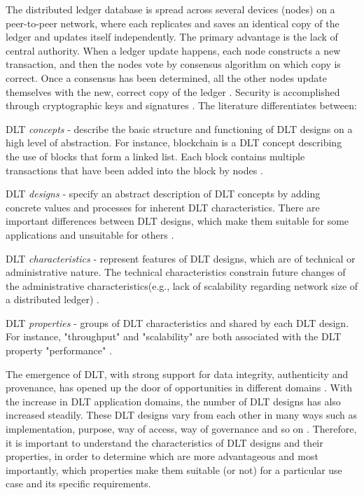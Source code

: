 The distributed ledger database is spread across several devices (nodes) on a peer-to-peer network, where each replicates and saves an identical copy of the ledger and updates itself independently. The primary advantage is the lack of central authority. When a ledger update happens, each node constructs a new transaction, and then the nodes vote by consensus algorithm on which copy is correct. Once a consensus has been determined, all the other nodes update themselves with the new, correct copy of the ledger \cite{dlt_2}. Security is accomplished through cryptographic keys and signatures \cite{dlt_1}. The literature \cite{dlt_4} differentiates between: \newline

DLT \textit{concepts} - describe the basic structure and functioning of DLT designs on a high level of abstraction. For instance, blockchain is a DLT concept describing the use of blocks that form a linked list. Each block contains multiple transactions that have been added into the block by nodes \cite{dlt_4}. \newline

DLT \textit{designs} - specify an abstract description of DLT concepts by adding concrete values and processes for inherent DLT characteristics. There are important differences between DLT designs, which make them suitable for some applications and unsuitable for others \cite{dlt_4}.\newline

DLT \textit{characteristics} - represent features of DLT designs, which are of technical or administrative nature. The technical characteristics constrain future changes of the administrative characteristics(e.g., lack of scalability regarding network size of a distributed ledger) \cite{dlt_4}.\newline

DLT \textit{properties} - groups of DLT characteristics and shared by each DLT design. For instance, "throughput" and "scalability" are both associated with the DLT property "performance" \cite{dlt_4}. \newline

The emergence of DLT, with strong support for data integrity, authenticity and provenance, has opened up the door of opportunities in different domains \cite{walmart,health_1,DP_storagesys,req_availability,scrybe}. With the increase in DLT application domains, the number of DLT designs has also increased steadily. These DLT designs vary from each other in many ways such as implementation, purpose, way of access, way of governance and so on \cite{dlt_3}. Therefore, it is important to understand the characteristics of DLT designs and their properties, in order to determine which are more advantageous and most importantly, which properties make them suitable (or not) for a particular use case and its specific requirements.

